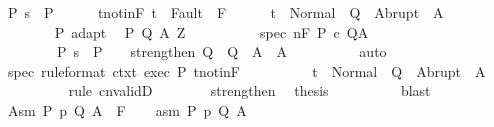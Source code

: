 \begin{isabellebody}
\ P{\isacharcolon}\ {\isachardoublequoteopen}s\ {\isasymin}\ P{\isachardoublequoteclose}\isanewline
\ \ \ \ \isamarkupfalse%
\ t{\isacharunderscore}notin{\isacharunderscore}F{\isacharcolon}\ {\isachardoublequoteopen}t\ {\isasymnotin}\ Fault\ {\isacharbackquote}\ F{\isachardoublequoteclose}\isanewline
\ \ \ \ \isamarkupfalse%
\ {\isachardoublequoteopen}t\ {\isasymin}\ Normal\ {\isacharbackquote}\ Q\ {\isasymunion}\ Abrupt\ {\isacharbackquote}\ A{\isachardoublequoteclose}\isanewline
\ \ \ \ \isamarkupfalse%
\ {\isacharminus}\isanewline
\ \ \ \ \ \ \isamarkupfalse%
\ P\ adapt\ \isamarkupfalse%
\ P{\isacharprime}\ Q{\isacharprime}\ A{\isacharprime}\ Z\ \ \isanewline
\ \ \ \ \ \ \ \ spec{\isacharcolon}\ {\isachardoublequoteopen}{\isasymGamma}{\isacharcomma}{\isasymTheta}{\isasymTurnstile}n{\isacharcolon}\isactrlbsub {\isacharslash}F\isactrlesub \ P{\isacharprime}\ c\ Q{\isacharprime}{\isacharcomma}A{\isacharprime}{\isachardoublequoteclose}\ \isanewline
\ \ \ \ \ \ \ \ P{\isacharprime}{\isacharcolon}\ {\isachardoublequoteopen}s\ {\isasymin}\ P{\isacharprime}{\isachardoublequoteclose}\ \ \ \ strengthen{\isacharcolon}\ {\isachardoublequoteopen}Q{\isacharprime}\ {\isasymsubseteq}\ Q\ {\isasymand}\ A{\isacharprime}\ {\isasymsubseteq}\ A{\isachardoublequoteclose}\isanewline
\ \ \ \ \ \ \ \ \isamarkupfalse%
\ auto\isanewline
\ \ \ \ \ \ \isamarkupfalse%
\ spec\ {\isacharbrackleft}rule{\isacharunderscore}format{\isacharbrackright}\ ctxt\ exec\ P{\isacharprime}\ t{\isacharunderscore}notin{\isacharunderscore}F\ \ \isanewline
\ \ \ \ \ \ \isamarkupfalse%
\ {\isachardoublequoteopen}t\ {\isasymin}\ Normal\ {\isacharbackquote}\ Q{\isacharprime}\ {\isasymunion}\ Abrupt\ {\isacharbackquote}\ A{\isacharprime}{\isachardoublequoteclose}\isanewline
\ \ \ \ \ \ \ \ \isamarkupfalse%
\ {\isacharparenleft}rule\ cnvalidD{\isacharparenright}\isanewline
\ \ \ \ \ \ \isamarkupfalse%
\ strengthen\ \isamarkupfalse%
\ {\isacharquery}thesis\isanewline
\ \ \ \ \ \ \ \ \isamarkupfalse%
\ blast\isanewline
\ \ \ \ \isamarkupfalse%
\isanewline
\ \ \isamarkupfalse%
\isanewline
{}\isamarkupfalse%
\isanewline
\ \ \isamarkupfalse%
\ {\isacharparenleft}Asm\ P\ p\ Q\ A\ {\isasymTheta}\ F{\isacharparenright}\isanewline
\ \ \isamarkupfalse%
\ asm{\isacharcolon}\ {\isachardoublequoteopen}{\isacharparenleft}P{\isacharcomma}\ p{\isacharcomma}\ Q{\isacharcomma}\ A{\isacharparenright}\ {\isasymin}\ {\isasymTheta}{\isachardoublequoteclose}\ \isamarkupfalse%

\end{isabellebody}
